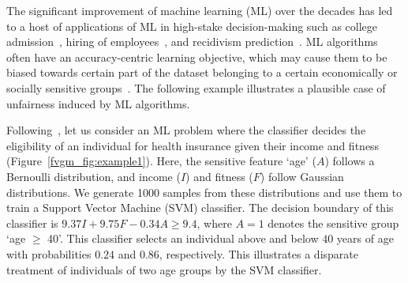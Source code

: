	The significant improvement of machine learning (ML) over the decades has led to a host of applications of ML in  high-stake decision-making such as college admission~\cite{martinez2021using}, hiring of employees~\cite{ajunwa2016hiring}, and recidivism prediction~\cite{tollenaar2013method,dressel2018accuracy}. ML algorithms often have an accuracy-centric learning objective, which may cause them to be biased towards certain part of the dataset belonging to a certain economically or socially sensitive groups~\cite{landy1978correlates,zliobaite2015relation,berk2019accuracy}.
	 The following example illustrates a plausible case of unfairness induced by ML algorithms. 
	\begin{example}\label{fvgm_example:intro}
		Following~\cite[Example 1.]{ghosh2020justicia}, let us consider an ML problem where the classifier decides the eligibility of an individual for health insurance given their income and fitness (Figure~\ref{fvgm_fig:example1}). Here, the sensitive feature `age' ($ A $) follows a Bernoulli distribution, and income ($ I $) and fitness ($ F $) follow Gaussian distributions. We generate 1000 samples from these distributions and use them to train a Support Vector Machine (SVM) classifier. The decision boundary of this classifier is $9.37I + 9.75F - 0.34A \ge 9.4$, where $A = 1$ denotes the sensitive group `age $ \ge $ 40'. This classifier selects an individual above and below $40$ years of age with probabilities $0.24$ and $0.86$, respectively. This illustrates a disparate treatment of individuals of two age groups by the SVM classifier. 
	\end{example}

